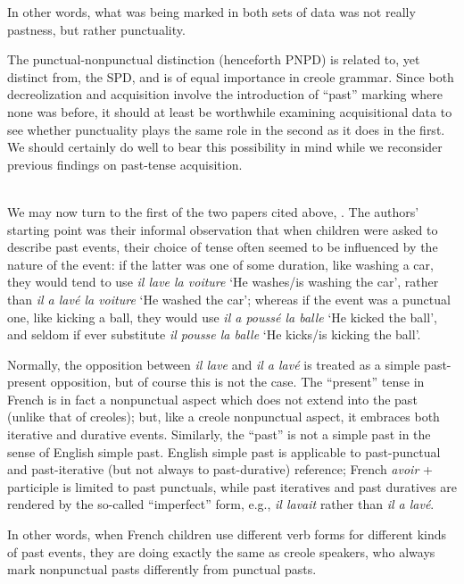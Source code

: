 \noindent In other words, what was being marked in both sets of data was not really pastness, but rather punctuality.

The punctual-nonpunctual distinction (henceforth PNPD) is related to, yet distinct from, the SPD, and is of equal importance in creole grammar. Since both decreolization and acquisition involve the introduction of ``past'' marking where none was before, it should at least be worthwhile examining acquisitional data to see whether punctuality plays the same role in the second as it does in the first. We should certainly do well to bear this possibility in mind while we reconsider previous findings on past-tense acquisition.\\\\

We may now turn to the first of the two papers cited above, \citet{BrockartEtAl1973}. The authors' starting point was their informal observation that when children were asked to describe past events, their choice of tense often seemed to be influenced by the nature of the event: if the latter was one of some duration, like washing a car, they would tend to use \textit{il lave la voiture} `He washes/is washing the car', rather than \textit{il a lav\'e la voiture} `He washed the car'; whereas if the event was a punctual one, like kicking a ball, they would use \textit{il a pouss\'e la balle} `He kicked the ball', and seldom if ever substitute \textit{il pousse la balle} `He kicks/is kicking the ball'.

Normally, the opposition between \textit{il lave} and \textit{il a lav\'e} is treated as a simple past-present opposition, but of course this is not the case. The ``present'' tense in French is in fact a nonpunctual aspect which does not extend into the past (unlike that of creoles); but, like a creole nonpunctual aspect, it embraces both iterative and durative events.
Similarly, the ``past'' is not a simple past in the sense of English simple past. English simple past is applicable to past-punctual and past-iterative (but not always to past-durative) reference; French \textit{avoir} + participle is limited to past punctuals, while past iteratives and past duratives are rendered by the so-called ``imperfect'' form, e.g., \textit{il lavait} rather than \textit{il a lav\'e}.

In other words, when French children use different verb forms for different kinds of past events, they are doing exactly the same as creole speakers, who always mark nonpunctual pasts differently from punctual pasts.

